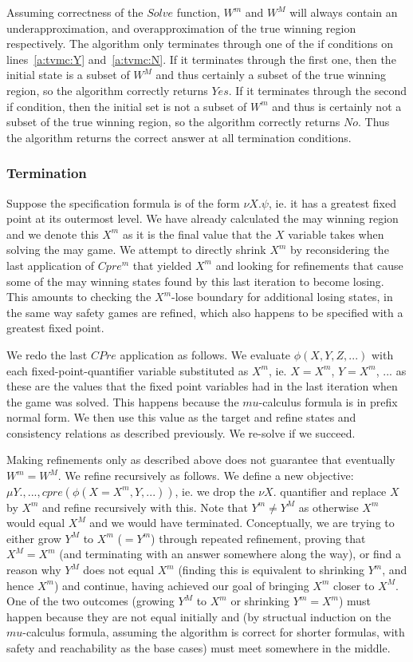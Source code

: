 Assuming correctness of the $Solve$ function, $W^m$ and $W^M$ will always contain an underapproximation, and overapproximation of the true winning region respectively. The algorithm only terminates through one of the if conditions on lines~\ref{a:tvmc:Y} and~\ref{a:tvmc:N}. If it terminates through the first one, then the initial state is a subset of $W^M$ and thus certainly a subset of the true winning region, so the algorithm correctly returns $Yes$. If it terminates through the second if condition, then the initial set is not a subset of $W^m$ and thus is certainly not a subset of the true winning region, so the algorithm correctly returns $No$. Thus the algorithm returns the correct answer at all termination conditions.

\subsubsection{Termination}

Suppose the specification formula is of the form $\nu X. \psi$, ie. it has a greatest fixed point at its outermost level. We have already calculated the may winning region and we denote this $X^m$ as it is the final value that the $X$ variable takes when solving the may game. We attempt to directly shrink $X^m$ by reconsidering the last application of $Cpre^m$ that yielded $X^m$ and looking for refinements that cause some of the may winning states found by this last iteration to become losing. This amounts to checking the $X^m$-lose boundary for additional losing states, in the same way safety games are refined, which also happens to be specified with a greatest fixed point.

We redo the last $CPre$ application as follows. We evaluate $\phi(X, Y, Z, ...)$ with each fixed-point-quantifier variable substituted as $X^m$, ie. $X=X^m$, $Y=X^m$, ... as these are the values that the fixed point variables had in the last iteration when the game was solved. This happens because the $mu$-calculus formula is in prefix normal form. We then use this value as the target and refine states and consistency relations as described previously. We re-solve if we succeed.

Making refinements only as described above does not guarantee that eventually $W^m = W^M$. We refine recursively as follows. We define a new objective: $\mu Y., ..., cpre(\phi(X=X^m, Y, ...))$, ie. we drop the $\nu X.$ quantifier and replace $X$ by $X^m$ and refine recursively with this. Note that $Y^m \neq Y^M$ as otherwise $X^m$ would equal $X^M$ and we would have terminated. Conceptually, we are trying to either grow $Y^M$ to $X^m$ ($=Y^m$) through repeated refinement, proving that $X^M = X^m$ (and terminating with an answer somewhere along the way), or find a reason why $Y^M$ does not equal $X^m$ (finding this is equivalent to shrinking $Y^m$, and hence $X^m$) and continue, having achieved our goal of bringing $X^m$ closer to $X^M$. One of the two outcomes (growing $Y^M$ to $X^m$ or shrinking $Y^m = X^m$) must happen because they are not equal initially and (by structual induction on the $mu$-calculus formula, assuming the algorithm is correct for shorter formulas, with safety and reachability as the base cases) must meet somewhere in the middle.

